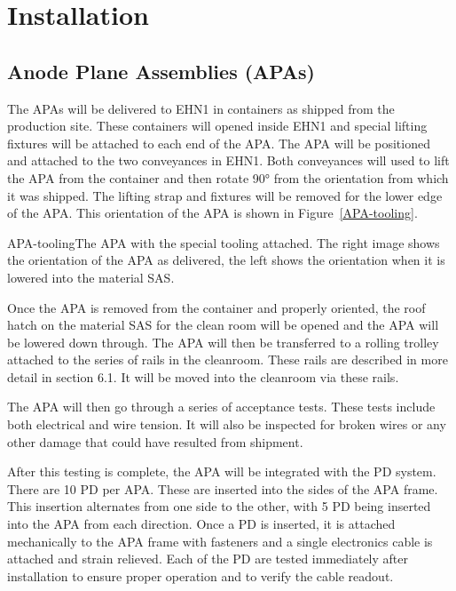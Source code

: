 
\section{Installation}


\subsection{Anode Plane Assemblies (APAs)}

The APAs will be delivered to EHN1 in containers as shipped from the production site.  These containers will opened inside EHN1 and special lifting fixtures will be attached to each end of the APA.  The APA will be positioned and attached to the two conveyances in EHN1.  Both conveyances will used to lift the APA from the container and then rotate 90° from the orientation from which it was shipped.  The lifting strap and fixtures will be removed for the lower edge of the APA.  This orientation of the APA is shown in Figure~\ref{APA-tooling}.

\begin{cdrfigure}{APA-tooling}{The APA with the special tooling attached.  The right image shows the orientation of the APA as delivered, the left shows the orientation when it is lowered into the material SAS. }
\end{cdrfigure}

Once the APA is removed from the container and properly oriented, the roof hatch on the material SAS for the clean room will be opened and the APA will be lowered down through.  The APA will then be transferred to a rolling trolley attached to the series of rails in the cleanroom.  These rails are described in more detail in section 6.1.  It will be moved into the cleanroom via these rails.  

The APA will then go through a series of acceptance tests.  These tests include both electrical and wire tension.  It will also be inspected for broken wires or any other damage that could have resulted from shipment.  

After this testing is complete, the APA will be integrated with the PD system.  There are 10 PD per APA.  These are inserted into the sides of the APA frame.  This insertion alternates from one side to the other, with 5 PD being inserted into the APA from each direction.  Once a PD is inserted, it is attached mechanically to the APA frame with fasteners and a single electronics cable is attached and strain relieved.  Each of the PD are tested immediately after installation to ensure proper operation and to verify the cable readout.  

